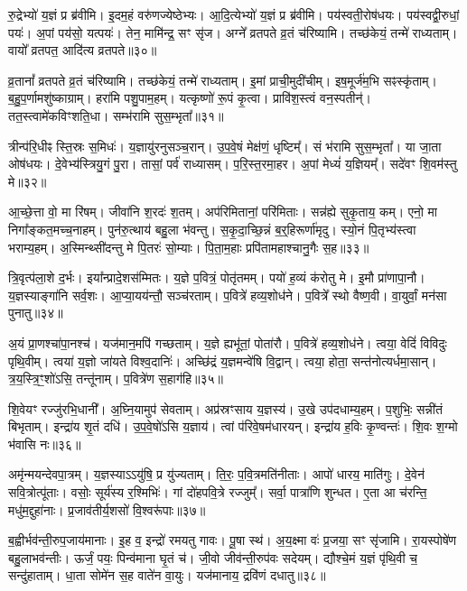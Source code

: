 रु॒द्रेभ्यो॑ य॒ज्ञं प्र ब्र॑वीमि।
इ॒दम॒हं वरु॑णज्येष्ठेभ्यः।
आ॒दि॒त्येभ्यो॑ य॒ज्ञं प्र ब्र॑वीमि।
पय॑स्वती॒रोष॑धयः।
पय॑स्वद्वी॒रुधां॒ पयः॑।
अ॒पां पय॑सो॒ यत्पयः॑।
तेन॒ मामि॑न्द्र॒ सꣳ सृ॑ज।
अग्ने᳚ व्रतपते व्र॒तं च॑रिष्यामि।
तच्छ॑केयं॒ तन्मे॑ राध्यताम्।
वायो᳚ व्रतपत॒ आदि॑त्य व्रतपते॥३०॥

व्र॒तानां᳚ व्रतपते व्र॒तं च॑रिष्यामि।
तच्छ॑केयं॒ तन्मे॑ राध्यताम्।
इ॒मां प्राची॒मुदी॑चीम्।
इष॒मूर्ज॑म॒भि सꣴस्कृ॑ताम्।
ब॒हु॒प॒र्णामशु॑ष्काग्राम्।
हरा॑मि पशु॒पाम॒हम्।
यत्कृष्णो॑ रू॒पं कृ॒त्वा।
प्रावि॑श॒स्त्वं वन॒स्पतीन्॑।
तत॒स्त्वामे॑कविꣳशति॒धा।
सम्भ॑रामि सुस॒म्भृता᳚॥३१॥

त्रीन्प॑रि॒धीꣴ स्ति॒स्रः स॒मिधः॑।
य॒ज्ञायु॑रनुसञ्च॒रान्।
उ॒प॒वे॒षं मेक्ष॑णं॒ धृष्टिम्᳚।
सं भ॑रामि सुस॒म्भृता᳚।
या जा॒ता ओष॑धयः।
दे॒वेभ्य॑स्त्रियु॒गं पु॒रा।
तासां॒ पर्व॑ राध्यासम्।
प॒रि॒स्त॒रमा॒हर\sn{}।
अ॒पां मेध्यं॑ य॒ज्ञियम्᳚।
सदे॑वꣳ शि॒वम॑स्तु मे॥३२॥

आ॒च्छे॒त्ता वो॒ मा रि॑षम्।
जीवा॑नि श॒रदः॑ श॒तम्।
अप॑रिमितानां॒ परि॑मिताः।
सन्न॑ह्ये सुकृ॒ताय॒ कम्।
एनो॒ मा निगा᳚ङ्कत॒मच्च॒नाहम्।
पुन॑रु॒त्थाय॑ बहु॒ला भ॑वन्तु।
स॒कृ॒दा॒च्छि॒न्नं ब॒र्॒हिरूर्णा॑मृदु।
स्यो॒नं पि॒तृभ्य॑स्त्वा भराम्य॒हम्।
अ॒स्मिन्थ्सी॑दन्तु मे पि॒तरः॑ सो॒म्याः।
पि॒ता॒म॒हाः प्रपि॑तामहाश्चानु॒गैः स॒ह॥३३॥

त्रि॒वृत्प॑ला॒शे द॒र्भः।
इया᳚न्प्रादे॒शस॑म्मितः।
य॒ज्ञे प॒वित्रं॒ पोतृ॑तमम्।
पयो॑ ह॒व्यं क॑रोतु मे।
इ॒मौ प्रा॑णापा॒नौ।
य॒ज्ञस्याङ्गा॑नि सर्व॒शः।
आ॒प्या॒यय॑न्तौ॒ सञ्च॑रताम्।
प॒वित्रे॑ हव्य॒शोध॑ने।
प॒वित्रे᳚ स्थो वैष्ण॒वी।
वा॒युर्वां॒ मन॑सा पुनातु॥३४॥

अ॒यं प्रा॒णश्चा॑पा॒नश्च॑।
यज॑मान॒मपि॑ गच्छताम्।
य॒ज्ञे ह्यभू॑तां॒ पोता॑रौ।
प॒वित्रे॑ हव्य॒शोध॑ने।
त्वया॒ वेदिं॑ विविदुः पृथि॒वीम्।
त्वया॑ य॒ज्ञो जा॑यते विश्व॒दानिः॑।
अच्छि॑द्रं य॒ज्ञमन्वे॑षि वि॒द्वान्।
त्वया॒ होता॒ सन्त॑नोत्यर्धमा॒सान्।
त्र॒य॒स्त्रि॒ꣳ॒शो॑ऽसि॒ तन्तू॑नाम्।
प॒वित्रे॑ण स॒हाग॑हि॥३५॥

शि॒वेयꣳ रज्जु॑रभि॒धानी᳚।
अ॒घ्नि॒यामुप॑ सेवताम्।
अप्र॑स्रꣳसाय य॒ज्ञस्य॑।
उ॒खे उप॑दधाम्य॒हम्।
प॒शुभिः॒ सन्नी॑तं बिभृताम्।
इन्द्रा॑य शृ॒तं दधि॑।
उ॒प॒वे॒षो॑ऽसि य॒ज्ञाय॑।
त्वां प॑रिवे॒षम॑धारयन्।
इन्द्रा॑य ह॒विः कृ॒ण्वन्तः॑।
शि॒वः श॒ग्मो भ॑वासि नः॥३६॥

अमृ॑न्मयन्देवपा॒त्रम्।
य॒ज्ञस्याऽऽयु॑षि॒ प्र यु॑ज्यताम्।
ति॒रः॒ प॒वि॒त्रमति॑नीताः।
आपो॑ धारय॒ माति॑गुः।
दे॒वेन॑ सवि॒त्रोत्पू॑ताः।
वसोः॒ सूर्य॑स्य र॒श्मिभिः॑।
गां दो॑हपवि॒त्रे रज्जुम्᳚।
सर्वा॒ पात्रा॑णि शुन्धत।
ए॒ता आ च॑रन्ति॒ मधु॑म॒द्दुहा॑नाः।
प्र॒जाव॑तीर्य॒शसो॑ वि॒श्वरू॑पाः॥३७॥

ब॒ह्वीर्भव॑न्ती॒रुप॒जाय॑मानाः।
इ॒ह व॒ इन्द्रो॑ रमयतु गावः।
पू॒षा स्थ॑।
अ॒य॒क्ष्मा वः॑ प्र॒जया॒ सꣳ सृ॑जामि।
रा॒यस्पोषे॑ण बहु॒लाभव॑न्तीः।
ऊर्जं॒ पयः॒ पिन्व॑माना घृ॒तं च॑।
जी॒वो जीव॑न्ती॒रुप॑वः सदेयम्।
द्यौश्चे॒मं य॒ज्ञं पृ॑थि॒वी च॒ सन्दु॑हाताम्।
धा॒ता सोमे॑न स॒ह वाते॑न वा॒युः।
यज॑मानाय॒ द्रवि॑णं दधातु॥३८॥


